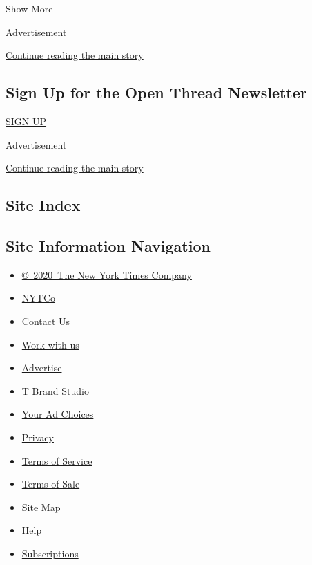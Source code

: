 Show More

Advertisement

\protect\hyperlink{after-mid2}{Continue reading the main story}

\hypertarget{sign-up-for-the-open-thread-newsletter}{%
\subsection{Sign Up for the Open Thread
Newsletter}\label{sign-up-for-the-open-thread-newsletter}}

\href{/newsletters/signup/TZ}{SIGN UP}

Advertisement

\protect\hyperlink{after-mktg}{Continue reading the main story}

\hypertarget{site-index}{%
\subsection{Site Index}\label{site-index}}

\hypertarget{site-information-navigation}{%
\subsection{Site Information
Navigation}\label{site-information-navigation}}

\begin{itemize}
\tightlist
\item
  \href{https://help.nytimes.com/hc/en-us/articles/115014792127-Copyright-notice}{©~2020~The
  New York Times Company}
\end{itemize}

\begin{itemize}
\tightlist
\item
  \href{https://www.nytco.com/}{NYTCo}
\item
  \href{https://help.nytimes.com/hc/en-us/articles/115015385887-Contact-Us}{Contact
  Us}
\item
  \href{https://www.nytco.com/careers/}{Work with us}
\item
  \href{https://nytmediakit.com/}{Advertise}
\item
  \href{http://www.tbrandstudio.com/}{T Brand Studio}
\item
  \href{https://www.nytimes.com/privacy/cookie-policy\#how-do-i-manage-trackers}{Your
  Ad Choices}
\item
  \href{https://www.nytimes.com/privacy}{Privacy}
\item
  \href{https://help.nytimes.com/hc/en-us/articles/115014893428-Terms-of-service}{Terms
  of Service}
\item
  \href{https://help.nytimes.com/hc/en-us/articles/115014893968-Terms-of-sale}{Terms
  of Sale}
\item
  \href{https://spiderbites.nytimes.com}{Site Map}
\item
  \href{https://help.nytimes.com/hc/en-us}{Help}
\item
  \href{https://www.nytimes.com/subscription?campaignId=37WXW}{Subscriptions}
\end{itemize}
